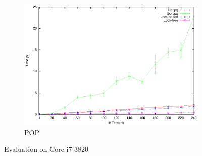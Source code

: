 \begin{figure}
\begin{subfigure}[b]{0.3\textwidth}
		\centering
		\includegraphics[width=\textwidth]{../plots/i7_pop/runtime_pop_i7}
		\caption{POP}
		\label{fig:i7_pop}
	\end{subfigure}
	\caption{Evaluation on Core i7-3820}
	\label{fig:eval_i7}
\end{figure}
\figurename
